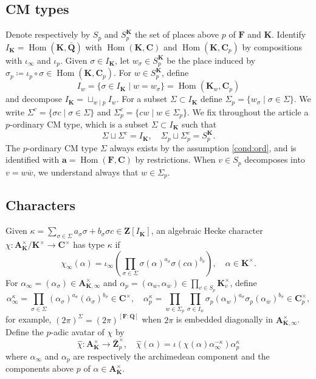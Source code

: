 \documentclass[leqno]{amsart}
\newcommand{\bw}{\overline{w}}
\newcommand{\Q}{{\mathbf{Q}}}
\newcommand{\Z}{{\mathbf{Z}}}
\newcommand{\C}{\mathbf C}
\newcommand{\A}{\mathbf A}
\newcommand{\arch}{\mathbf{a}}
\newcommand{\F}{{\mathbf{F}}} %
\newcommand{\K}{{\mathbf{K}}} %
\DeclareMathOperator{\Hom}{Hom}
\theoremstyle{definition}
\theoremstyle{remark}
\begin{document}
\subsection{CM types}

Denote respectively by $S_p$ and $S_p^\K$ the set of places above $p$
of $\F$ and $\K$.
Identify $I_\K=\Hom(\K,\bar{\Q})$ with
$\Hom(\K,\C)$ and $\Hom(\K,\C_p)$ by compositions with $\iota_\infty$ and $\iota_p$.
Given $\sigma\in I_\K$,
let $w_\sigma\in S_p^\K$ be the place induced by
$\sigma_p\coloneqq \iota_p\circ \sigma\in\Hom(\K,\C_p)$.
For $w\in S_p^\K$, define
\[
    I_w=\{\sigma\in I_\K\mid w=w_\sigma \}=\Hom(\K_w,\C_p)
\]
and decompose $I_\K=\sqcup_{w\mid p}I_w$.
For a subset $\Sigma\subset I_\K$
define $\Sigma_p=\{w_\sigma\mid \sigma\in \Sigma\}$.
We write
$\Sigma^c=\{\sigma c\mid \sigma\in \Sigma\}$ and 
$\Sigma_p^c=\{cw\mid w\in \Sigma_p\}$.
We fix throughout the article a $p$-ordinary CM type,
which is a subset $\Sigma\subset I_\K$ such that
\[
    \Sigma\sqcup \Sigma^c=I_\K,\quad
    \Sigma_p\sqcup \Sigma_p^c=S_p^\K.
\]
The $p$-ordinary CM type $\Sigma$
always exists by the assumption \eqref{cond:ord},
and is identified with $\arch=\Hom(\F,\C)$ by restrictions.
When $v\in S_p$ decomposes into $v=w\bw$,
we understand always that $w\in \Sigma_p$.

\subsection{Characters}

Given 
$\kappa=\sum_{\sigma\in \Sigma} a_\sigma\sigma+b_\sigma\sigma c\in \Z[I_\K]$,
an algebraic Hecke character 
$\chi\colon \A_\K^\times/\K^\times\to \C^\times$ 
has type $\kappa$ if
\[
    \chi_\infty(\alpha)=
    \iota_\infty \left(\prod_{\sigma\in \Sigma} 
    \sigma(\alpha)^{a_\sigma}\sigma(c \alpha)^{b_\sigma}\right),\quad
    \alpha\in \K^\times.
\]
For $\alpha_\infty=(\alpha_\sigma)\in \A_{\K,\infty}^\times$
and $\alpha_p=(\alpha_w,\alpha_{\bw})\in \prod_{v\in S_p}\K_v^\times$, 
define
\[
    \alpha_\infty^\kappa=
    \prod_{\sigma\in \Sigma} 
    (\alpha_\sigma)^{a_\sigma}(\bar{\alpha}_\sigma)^{b_\sigma}\in \C^\times,\quad
    \alpha_p^\kappa=
    \prod_{w\in \Sigma_p}
    \prod_{\sigma\in I_w}
    \sigma_p(\alpha_w)^{a_\sigma}\sigma_p(\alpha_{\bw})^{b_\sigma}\in \C_p^\times,
\]
for example,
$(2\pi)^\Sigma=(2\pi)^{[\F:\Q]}$
when $2\pi$ is embedded diagonally in $\A_{\K,\infty}^\times$.
Define the $p$-adic avatar of $\chi$ by
\[
    \hat{\chi}\colon \A_\K^\times\to \bar{\Z}_p^\times,\quad
    \hat{\chi}(\alpha)=\iota(\chi(\alpha)\alpha_\infty^{-\kappa})\alpha_p^{\kappa}
\]
where $\alpha_\infty$ and $\alpha_p$ are respectively 
the archimedean component and the components above $p$ of $\alpha\in \A_\K^\times$.
\end{document}
